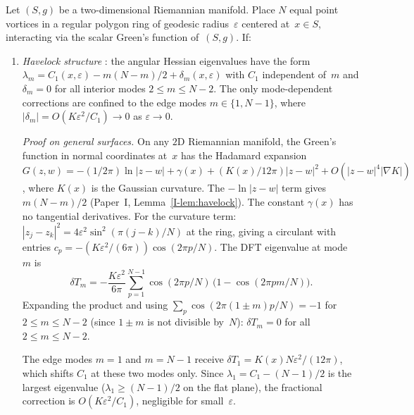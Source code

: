 \begin{theorem}
\label{thm:polygon-einstein}
Let $(S, g)$ be a two-dimensional Riemannian manifold.
Place $N$ equal point vortices in a regular polygon ring
of geodesic radius~$\varepsilon$ centered at~$x \in S$,
interacting via the scalar Green's function of~$(S, g)$.
If:
\begin{enumerate}
\item[\textup{(H1)}]
  \emph{Havelock structure} :
  the angular Hessian eigenvalues
  have the form $\lambda_m = C_1(x,\varepsilon) - m(N{-}m)/2
  + \delta_m(x,\varepsilon)$
  with $C_1$ independent of~$m$ and
  $\delta_m = 0$ for all interior modes $2 \le m \le N{-}2$.
  The only mode-dependent corrections are confined to the
  edge modes $m \in \{1, N{-}1\}$, where
  $|\delta_m| = O(K\varepsilon^2/C_1) \to 0$ as
  $\varepsilon \to 0$.

  \emph{Proof on general surfaces.}
  On any $2$D Riemannian manifold, the Green's function in
  normal coordinates at~$x$ has the Hadamard expansion
  $G(z,w) = -(1/2\pi)\ln|z{-}w| + \gamma(x)
  + (K(x)/12\pi)|z{-}w|^2 + O(|z{-}w|^4|\nabla K|)$,
  where $K(x)$ is the Gaussian curvature.
  The $-\ln|z{-}w|$ term gives $m(N{-}m)/2$
  (Paper~I, Lemma~\ref*{I-lem:havelock}).
  The constant $\gamma(x)$ has no tangential derivatives.
  For the curvature term: $|z_j{-}z_k|^2 = 4\varepsilon^2
  \sin^2(\pi(j{-}k)/N)$ at the ring, giving
  a circulant with entries
  $c_p = -(K\varepsilon^2/(6\pi))\cos(2\pi p/N)$.
  The DFT eigenvalue at mode~$m$ is
  \[
    \delta T_m
    = -\frac{K\varepsilon^2}{6\pi}
    \sum_{p=1}^{N-1}\cos(2\pi p/N)\,
    \bigl(1 - \cos(2\pi pm/N)\bigr).
  \]
  Expanding the product and using
  $\sum_p \cos(2\pi(1{\pm}m)p/N) = -1$
  for $2 \le m \le N{-}2$
  (since $1{\pm}m$ is not divisible by~$N$):
  $\delta T_m = 0$ for all $2 \le m \le N{-}2$.

  The edge modes $m = 1$ and $m = N{-}1$ receive
  $\delta T_1 = K(x) N\varepsilon^2/(12\pi)$,
  which shifts $C_1$ at these two modes only.
  Since $\lambda_1 = C_1 - (N{-}1)/2$ is the
  largest eigenvalue ($\lambda_1 \ge (N{-}1)/2$ on the
  flat plane), the fractional correction is
  $O(K\varepsilon^2/C_1)$, negligible for small~$\varepsilon$.


\end{enumerate}
\end{theorem}
